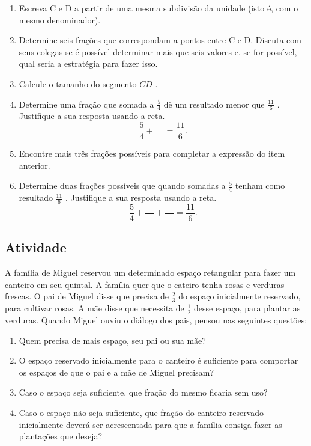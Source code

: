 \documentclass[a4,12pt]{book}
\begin{document}
\begin{enumerate} [\quad a)] %
  \item     Escreva C e D a partir de uma mesma subdivisão da unidade (isto é, com o mesmo denominador).
  \item     Determine seis frações que correspondam a pontos entre C e D.     \mbox{} \newline      Discuta com seus colegas se é possível determinar mais que seis valores e, se for possível, qual seria a estratégia para fazer isso.
  \item     Calcule o tamanho do segmento     $CD$    .
  \item     Determine uma fração que somada a     $\frac{5}{4}$     dê um resultado menor que     $\frac{11}{6}$    . Justifique a sua resposta usando a reta.     $$ \dfrac{5}{4} +\dfrac{\quad}{} = \dfrac{11}{6}.$$     
  \item     Encontre mais três frações possíveis para completar a expressão do item anterior. 
  \item     Determine duas frações possíveis que quando somadas a     $\frac{5}{4}$     tenham como resultado     $\frac{11}{6}$    . Justifique a sua resposta usando a reta.     $$ \dfrac{5}{4} +\dfrac{\quad}{} + \dfrac{\quad}{} = \dfrac{11}{6}.$$     
\end{enumerate} %

\subsection{Atividade}

A família de Miguel reservou um determinado espaço retangular para fazer um canteiro em seu quintal. A família quer que o cateiro tenha rosas e verduras frescas. O pai de Miguel disse que precisa de $\frac{2}{3}$ do espaço inicialmente reservado, para cultivar rosas. A mãe disse que necessita de $\frac{1}{2}$ desse espaço, para plantar as verduras. Quando Miguel ouviu o diálogo dos pais, pensou nas seguintes questões:
\begin{enumerate} [\quad a)] %
  \item     Quem precisa de mais espaço, seu pai ou sua mãe? 
  \item     O espaço reservado inicialmente para o canteiro é suficiente para comportar os espaços de que o pai e a mãe de Miguel precisam? 
  \item     Caso o espaço seja suficiente, que fração do mesmo ficaria sem uso? 
  \item     Caso o espaço não seja suficiente, que fração do canteiro reservado inicialmente deverá ser acrescentada para que a família consiga fazer as plantações que deseja? 
\end{enumerate} %
\end{document}

